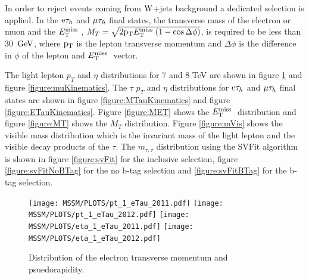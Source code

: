 In order to reject events coming from $\mathrm{W}$+jets background a dedicated selection is applied. 
In the $\mathrm{e}\mathrm{\tau}_h$ and $\mathrm{\mu}\mathrm{\tau}_h$ final states, the transverse mass of the electron 
or muon and the $E_\mathrm{T}^{\mathrm{miss}}\;$, $M_{T} = \sqrt{2 \mathrm{p_{T}} E_\mathrm{T}^{\mathrm{miss}}\; (1-\cos\Delta\phi)}$, is required to 
be less than 30~$\mathrm{GeV}$, where $\mathrm{p_{T}}$ is the lepton transverse momentum and $\Delta\phi$ is the difference in $\phi$ of the lepton and $E_\mathrm{T}^{\mathrm{miss}}\;$ vector. 

The light lepton $p_{T}$ and $\eta$ distributions for 
7 and 8 TeV are shown in figure \ref{figure:eKinematics} 
and figure \ref{figure:muKinematics}. The $\tau$ $p_{T}$ 
and $\eta$ distributions for $\mathrm{e}\mathrm{\tau}_h$ and $\mathrm{\mu}\mathrm{\tau}_h$ 
final states are shown in figure \ref{figure:MTauKinematics} 
and figure \ref{figure:ETauKinematics}.
Figure \ref{figure:MET} shows the $E_\mathrm{T}^{\mathrm{miss}}\;$ distribution and 
figure \ref{figure:MT} shows the $M_{T}$ distribution.
Figure \ref{figure:mVis} shows the visible mass distribution 
which is the invariant mass of the light lepton and the visible decay products of the $\tau$.
The $m_{\tau,\tau}$ distribution using the SVFit algorithm is shown in
figure \ref{figure:svFit} for the inclusive selection, figure \ref{figure:svFitNoBTag}
for the no b-tag selection and \ref{figure:svFitBTag} for the b-tag selection.

\begin{figure}[htbp]
  \begin{center}
    \texttt{[image: MSSM/PLOTS/pt\_1\_eTau\_2011.pdf]}
    \texttt{[image: MSSM/PLOTS/pt\_1\_eTau\_2012.pdf]}
    \texttt{[image: MSSM/PLOTS/eta\_1\_eTau\_2011.pdf]}
    \texttt{[image: MSSM/PLOTS/eta\_1\_eTau\_2012.pdf]}
    \caption{
      Distribution of the electron transverse momentum and psuedorapidity.    }
    \label{figure:eKinematics}
  \end{center}
\end{figure}


